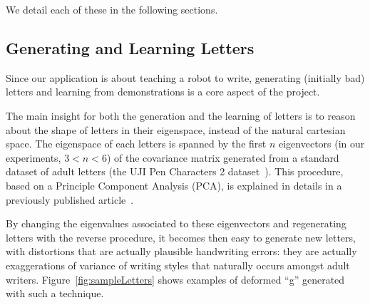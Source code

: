\documentclass{article}
\begin{document}
We detail each of these in the following sections.

\subsection{Generating and Learning Letters}

Since our application is about teaching a robot to write, generating (initially
bad) letters and learning from demonstrations is a core aspect of the project.

The main insight for both the generation and the learning of letters is to
reason about the shape of letters in their eigenspace, instead of the natural
cartesian space. The eigenspace of each letters is spanned by the first $n$
eigenvectors (in our experiments, $3 < n < 6$) of the covariance matrix
generated from a standard dataset of adult letters (the UJI Pen Characters 2
dataset~\cite{Llorens2008}).  This procedure, based on a Principle Component
Analysis (PCA), is explained in details in a previously published
article~\cite{hood2015when}.

By changing the eigenvalues associated to these eigenvectors and regenerating
letters with the reverse procedure, it becomes then easy to generate new
letters, with distortions that are actually plausible handwriting errors: they
are actually exaggerations of variance of writing styles that naturally
occurs amongst adult writers.  Figure~\ref{fig:sampleLetters} shows examples of
deformed ``g'' generated with such a technique.
\end{document}
